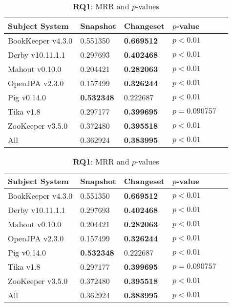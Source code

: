 \begin{table}[t]
\renewcommand{\arraystretch}{1.3}
\footnotesize
\centering
\caption{{\bf RQ1}: MRR and $p$-values}
\begin{tabular}{l|ll|ll}
\toprule
Subject System & Snapshot & Changeset & $p$-value  \\
\midrule
BookKeeper v4.3.0 & 0.551350 & {\bf 0.669512 } & $p < 0.01$ \\
Derby v10.11.1.1 & 0.297693 & {\bf 0.402468 } & $p < 0.01$ \\
Mahout v0.10.0 & 0.204421 & {\bf 0.282063 } & $p < 0.01$ \\
OpenJPA v2.3.0 & 0.157499 & {\bf 0.326244 } & $p < 0.01$ \\
Pig v0.14.0 & {\bf 0.532348 } & 0.222687 & $p < 0.01$ \\
Tika v1.8 & 0.297177 & {\bf 0.399695 } & $p = 0.090757$ \\
ZooKeeper v3.5.0 & 0.372480 & {\bf 0.395518 } & $p < 0.01$ \\
\midrule
All & 0.362924 & {\bf 0.383995 } & $p < 0.01$ \\
\bottomrule
\end{tabular}
\label{table:rq1:class:lda}
\caption{{\bf RQ1}: MRR and $p$-values}
\begin{tabular}{l|ll|ll}
\toprule
Subject System & Snapshot & Changeset & $p$-value  \\
\midrule
BookKeeper v4.3.0 & 0.551350 & {\bf 0.669512 } & $p < 0.01$ \\
Derby v10.11.1.1 & 0.297693 & {\bf 0.402468 } & $p < 0.01$ \\
Mahout v0.10.0 & 0.204421 & {\bf 0.282063 } & $p < 0.01$ \\
OpenJPA v2.3.0 & 0.157499 & {\bf 0.326244 } & $p < 0.01$ \\
Pig v0.14.0 & {\bf 0.532348 } & 0.222687 & $p < 0.01$ \\
Tika v1.8 & 0.297177 & {\bf 0.399695 } & $p = 0.090757$ \\
ZooKeeper v3.5.0 & 0.372480 & {\bf 0.395518 } & $p < 0.01$ \\
\midrule
All & 0.362924 & {\bf 0.383995 } & $p < 0.01$ \\
\bottomrule
\end{tabular}
\label{table:rq1:method:lda}
\end{table}
